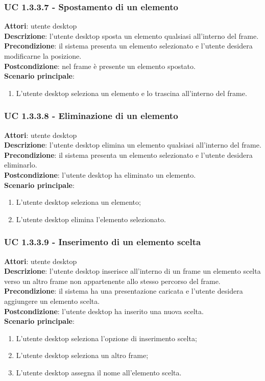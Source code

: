 \subsubsection{UC 1.3.3.7 - Spostamento di un elemento}{
	\label{uc1.3.3.7}
	\textbf{Attori}: utente desktop \\
	\textbf{Descrizione}: l'utente desktop sposta un elemento qualsiasi all'interno del frame. \\
	\textbf{Precondizione}: il sistema presenta un elemento selezionato e l'utente desidera modificarne la posizione.	\\
	\textbf{Postcondizione}: nel frame è presente un elemento spostato.	\\
	\textbf{Scenario principale}:
	\begin{enumerate}
		\item L'utente desktop seleziona un elemento e lo trascina all'interno del frame.
	\end{enumerate}
	}
\subsubsection{UC 1.3.3.8 - Eliminazione di un elemento}{
	\label{uc1.3.3.8}
	\textbf{Attori}: utente desktop \\
	\textbf{Descrizione}: l'utente desktop elimina un elemento qualsiasi all'interno del frame. \\
	\textbf{Precondizione}: il sistema presenta un elemento selezionato e l'utente desidera eliminarlo.	\\
	\textbf{Postcondizione}: l'utente desktop ha eliminato un elemento.	\\
	\textbf{Scenario principale}:
	\begin{enumerate}
		\item L'utente desktop seleziona un elemento;
		\item L'utente desktop elimina l'elemento selezionato.
	\end{enumerate}
	}
\subsubsection{UC 1.3.3.9 - Inserimento di un elemento scelta}{
	\label{uc1.3.3.9}
	\textbf{Attori}: utente desktop \\
	\textbf{Descrizione}: l'utente desktop inserisce all'interno di un frame un elemento scelta verso un altro frame non appartenente allo stesso percorso del frame. \\
	\textbf{Precondizione}: il sistema ha una presentazione caricata e l'utente desidera aggiungere un elemento scelta.	\\
	\textbf{Postcondizione}: l'utente desktop ha inserito una nuova scelta.	\\
	\textbf{Scenario principale}:
	\begin{enumerate}
		\item L'utente desktop seleziona l'opzione di inserimento scelta;
		\item L'utente desktop seleziona un altro frame;
		\item L'utente desktop assegna il nome all'elemento scelta.
	\end{enumerate}
	}
